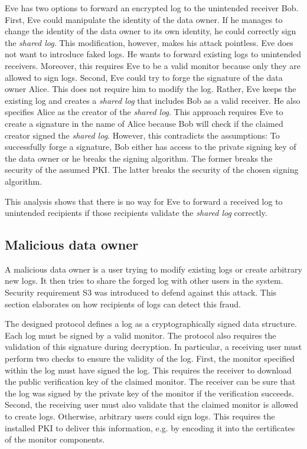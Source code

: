 \documentclass[../main.tex]{subfiles}
\begin{document}
Eve has two options to forward an encrypted log to the unintended receiver Bob.
First, Eve could manipulate the identity of the data owner.
If he manages to change the identity of the data owner to its own identity, he could correctly sign the \emph{shared log}.
This modification, however, makes his attack pointless.
Eve does not want to introduce faked logs.
He wants to forward existing logs to unintended receivers.
Moreover, this requires Eve to be a valid monitor because only they are allowed to sign logs.
Second, Eve could try to forge the signature of the data owner Alice.
This does not require him to modify the log.
Rather, Eve keeps the existing log and creates a \emph{shared log} that includes Bob as a valid receiver.
He also specifies Alice as the creator of the \emph{shared log}.
This approach requires Eve to create a signature in the name of Alice because Bob will check if the claimed creator signed the \emph{shared log}.
However, this contradicts the assumptions:
To successfully forge a signature, Bob either has access to the private signing key of the data owner or he breaks the signing algorithm.
The former breaks the security of the assumed PKI.
The latter breaks the security of the chosen signing algorithm.

This analysis shows that there is no way for Eve to forward a received log to unintended recipients if those recipients validate the \emph{shared log} correctly.


\subsection{Malicious data owner}
A malicious data owner is a user trying to modify existing logs or create arbitrary new logs.
It then tries to share the forged log with other users in the system.
Security requirement S3 was introduced to defend against this attack.
This section elaborates on how recipients of logs can detect this fraud.

The designed protocol defines a log as a cryptographically signed data structure.
Each log must be signed by a valid monitor.
The protocol also requires the validation of this signature during decryption.
In particular, a receiving user must perform two checks to ensure the validity of the log.
First, the monitor specified within the log must have signed the log.
This requires the receiver to download the public verification key of the claimed monitor.
The receiver can be sure that the log was signed by the private key of the monitor if the verification succeeds.
Second, the receiving user must also validate that the claimed monitor is allowed to create logs.
Otherwise, arbitrary users could sign logs.
This requires the installed PKI to deliver this information, e.g. by encoding it into the certificates of the monitor components.
\end{document}
